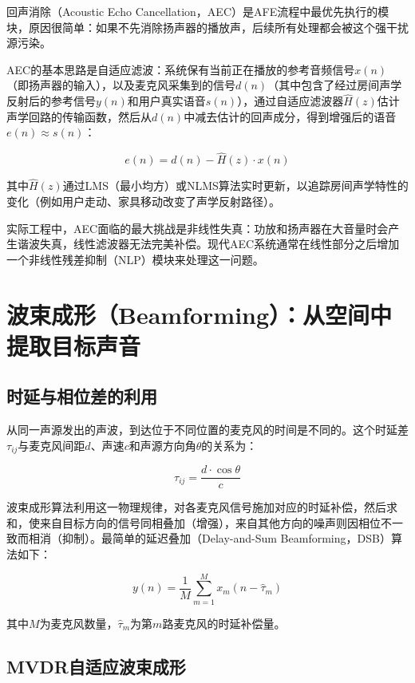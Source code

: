 \documentclass[12pt, a4paper, twoside, openright]{book}
\begin{document}
回声消除（Acoustic Echo Cancellation，AEC）是AFE流程中最优先执行的模块，原因很简单：如果不先消除扬声器的播放声，后续所有处理都会被这个强干扰源污染。

AEC的基本思路是自适应滤波：系统保有当前正在播放的参考音频信号$x(n)$（即扬声器的输入），以及麦克风采集到的信号$d(n)$（其中包含了经过房间声学反射后的参考信号$y(n)$和用户真实语音$s(n)$），通过自适应滤波器$\hat{H}(z)$估计声学回路的传输函数，然后从$d(n)$中减去估计的回声成分，得到增强后的语音$e(n) \approx s(n)$：

\begin{equation}
  e(n) = d(n) - \hat{H}(z) \cdot x(n)
\end{equation}

其中$\hat{H}(z)$通过LMS（最小均方）或NLMS算法实时更新，以追踪房间声学特性的变化（例如用户走动、家具移动改变了声学反射路径）。

实际工程中，AEC面临的最大挑战是非线性失真：功放和扬声器在大音量时会产生谐波失真，线性滤波器无法完美补偿。现代AEC系统通常在线性部分之后增加一个非线性残差抑制（NLP）模块来处理这一问题。

\section{波束成形（Beamforming）：从空间中提取目标声音}

\subsection{时延与相位差的利用}

从同一声源发出的声波，到达位于不同位置的麦克风的时间是不同的。这个时延差$\tau_{ij}$与麦克风间距$d$、声速$c$和声源方向角$\theta$的关系为：

\begin{equation}
  \tau_{ij} = \frac{d \cdot \cos\theta}{c}
\end{equation}

波束成形算法利用这一物理规律，对各麦克风信号施加对应的时延补偿，然后求和，使来自目标方向的信号同相叠加（增强），来自其他方向的噪声则因相位不一致而相消（抑制）。最简单的延迟叠加（Delay-and-Sum Beamforming，DSB）算法如下：

\begin{equation}
  y(n) = \frac{1}{M} \sum_{m=1}^{M} x_m\!\left(n - \hat{\tau}_m\right)
\end{equation}

其中$M$为麦克风数量，$\hat{\tau}_m$为第$m$路麦克风的时延补偿量。

\subsection{MVDR自适应波束成形}
\end{document}
